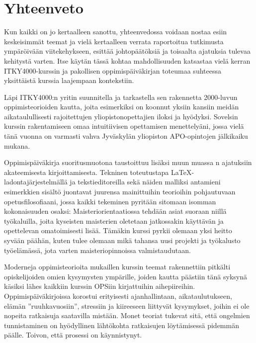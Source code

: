 \documentclass[utf8]{gradu3}
\begin{document}
\chapter{Yhteenveto}
\label{yhteenveto}

Kun kaikki on jo kertaalleen sanottu, yhteenvedossa voidaan nostaa
esiin keskeisimmät teemat ja vielä kertaalleen verrata raportoitua
tutkimusta ympäröivään viitekehykseen, esittää johtopäätöksiä ja
toisaalta ajatuksia tulevaa kehitystä varten. Itse käytän tässä kohtaa
mahdollisuuden katsastaa vielä kerran ITKY4000-kurssin ja pakollisen
oppimispäiväkirjan toteumaa suhteessa yksittäistä kurssia laajempaan
kontekstiin.

Läpi ITKY4000:n yritin suunnitella ja tarkastella sen rakennetta
2000-luvun oppimisteorioiden kautta, joita esimerkiksi
\textcite{Illeris2009contemporaryTheories} on koonnut yksiin kansiin
meidän aikataulullisesti rajoitettujen yliopistonopettajien iloksi ja
hyödyksi. Sovelsin kurssin rakentamiseen omaa intuitiivisen
opettamisen menettelyäni, jossa vielä tänä vuonna on varmasti vahva
Jyväskylän yliopiston APO-opintojen
\parencite{LaineMalinen2009elavaPeilisali} jälkikaiku mukana.

Oppimispäiväkirja suoritusmuotona taustoittuu lisäksi muun muassa
\citeauthor{Badley2009shapingAndReshaping}n
\parencite*{Badley2009shapingAndReshaping} ajatuksiin akateemisesta
kirjoittamisesta. Tekninen toteutustapa \LaTeX -ladontajärjestelmällä
ja tekstieditoreilla sekä näiden malliksi antamieni esimerkkien
sisältö juontavat juurensa mainittuihin teorioihin pohjautuvaan
opetusfilosofiaani, jossa kaikki tekeminen pyritään sitomaan isomman
kokonaisuuden osaksi: Maisteriorientaatiossa tehdään asiat suoraan
niillä työkaluilla, joita kyseisten maisterien oletetaan jatkossakin
käyttävän ja opettelevan omatoimisesti lisää. Tämäkin kurssi pyrkii
olemaan yksi heitto syvään päähän, kuten tulee olemaan mikä tahansa
uusi projekti ja työkalusto työelämässä, jota varten
maisteriopinnoissa valmistaudutaan.

Moderneja oppimisteorioita mukaillen kurssin teemat rakennettiin
pitkälti opiskelijoiden omien kysymysten ympärille, joiden kautta
päästiin tänä syksynä käsiksi lähes kaikkiin kurssin OPSiin
kirjattuihin aihepiireihin. Oppimispäiväkirjoissa korostui erityisesti
ajanhallintaan, aikataulutukseen, elämän ''ruuhkavuosiin'', stressiin
ja kiireeseen liittyvät kysymykset, joihin ei ole nopeita ratkaisuja
saatavilla mistään. Monet teoriat
\parencite[edelleen erityisesti][]{Illeris2009contemporaryTheories} tukevat sitä, että
ongelmien tunnistaminen on hyödyllinen lähtökohta ratkaisujen
löytämisessä pidemmän päälle. Toivon, että prosessi on käynnistynyt.
\end{document}

